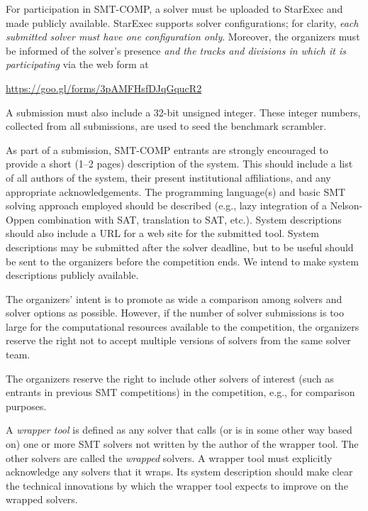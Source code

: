 \documentclass[12pt]{article}
\begin{document}
For participation in SMT-COMP, a solver must be uploaded to StarExec
and made publicly available.  StarExec supports solver configurations;
for clarity, \emph{each submitted solver must have one configuration
  only}.  Moreover, the organizers must be informed of the solver's
presence \emph{and the tracks and divisions in which it is
  participating} via the web form at
\begin{center}
  \url{https://goo.gl/forms/3pAMFHsfDJqGqucR2}
\end{center}
A submission must also include a 32-bit unsigned integer.  These
integer numbers, collected from all submissions, are used to seed the
benchmark scrambler.

%
As part of a submission, SMT-COMP entrants are strongly encouraged to
provide a short (1--2 pages) description of the system.  This should
include a list of all authors of the system, their present
institutional affiliations, and any appropriate acknowledgements.  The
programming language(s) and basic SMT solving approach employed should
be described (e.g., lazy integration of a Nelson-Oppen combination
with SAT, translation to SAT, etc.).  System descriptions should also
include a URL for a web site for the submitted tool.  System
descriptions may be submitted after the solver deadline, but to be
useful should be sent to the organizers before the competition ends.
We intend to make system descriptions publicly available.

%
The organizers' intent is to promote as wide a comparison among
solvers and solver options as possible.  However, if the number of
solver submissions is too large for the computational resources
available to the competition, the organizers reserve the right not to
accept multiple versions of solvers from the same solver team.

%
The organizers reserve the right to include other solvers of interest
(such as entrants in previous SMT competitions) in the competition,
e.g., for comparison purposes.

%
A \emph{wrapper tool} is defined as any solver that calls (or is in
some other way based on) one or more SMT solvers not written by the
author of the wrapper tool.  The other solvers are called the
\emph{wrapped} solvers.  A wrapper tool must explicitly acknowledge
any solvers that it wraps.  Its system description should make clear
the technical innovations by which the wrapper tool expects to improve
on the wrapped solvers.
\end{document}
